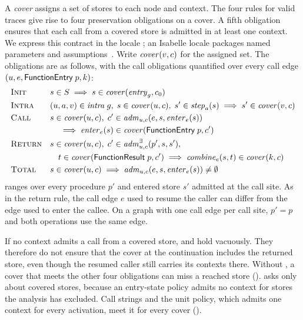 A \emph{cover} assigns a set of stores to each node and context. The four
rules for valid traces give rise to four preservation obligations on a cover.
A fifth obligation ensures that each call from a covered store is admitted in
at least one context. We express this contract in the locale
; an Isabelle locale packages named parameters and
assumptions~\cite{ballarin14}. Write $\mathit{cover}(v,c)$ for the assigned set. The obligations are as follows, with the call obligations
quantified over every call edge $(u, e, \textsf{FunctionEntry}\;p, k)$:
\begin{align*}
  &\textsc{Init} && s \in S \implies s \in \mathit{cover}(\mathit{entry}_g, c_0)\\
  &\textsc{Intra} && (u, a, v) \in \mathit{intra}\;g,\; s \in \mathit{cover}(u, c),\; s' \in \mathit{step}_a(s) \implies s' \in \mathit{cover}(v, c)\\
  &\textsc{Call} && s \in \mathit{cover}(u, c),\; c' \in \mathit{adm}_{u,c}(e, s, \mathit{enter}_e(s))\\
  &&&\quad \implies \mathit{enter}_e(s) \in \mathit{cover}(\textsf{FunctionEntry}\;p, c')\\
  &\textsc{Return} && s \in \mathit{cover}(u, c),\; c' \in \mathit{adm}^{\exists}_{u,c}(p', s, s'),\\
  &&&\quad t \in \mathit{cover}(\textsf{FunctionResult}\;p, c') \implies \mathit{combine}_e(s, t) \in \mathit{cover}(k, c)\\
  &\textsc{Total} && s \in \mathit{cover}(u, c) \implies \mathit{adm}_{u,c}(e, s, \mathit{enter}_e(s)) \neq \emptyset
\end{align*}
 ranges over every procedure $p'$ and entered store $s'$
admitted at the call site. As in the return rule, the call edge $e$ used to
resume the caller can differ from the edge used to enter the callee. On a
graph with one call edge per call site, $p' = p$ and both operations use the
same edge.

If no context admits a call from a covered store,  and
 hold vacuously. They therefore do not ensure that the cover at
the continuation includes the returned store, even though the resumed caller
still carries its contexts there. Without , a cover that meets the
other four obligations can miss a reached store
().  asks only about covered
stores, because an entry-state policy admits no context for stores the
analysis has excluded. Call strings and the unit policy, which admits one
context for every activation, meet it for every cover
().

